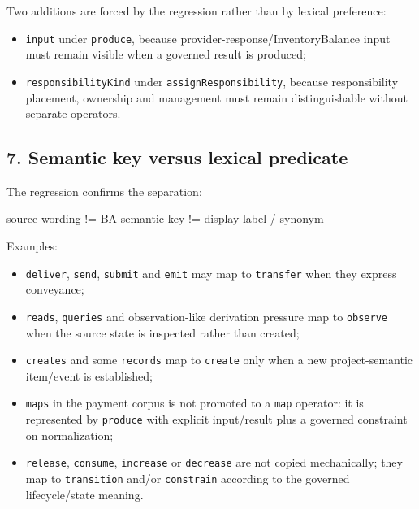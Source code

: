 \documentclass[
  10pt,
  a4paper,
]{article}
\newenvironment{Shaded}{}{}
\newcommand{\NormalTok}[1]{#1}
\providecommand{\tightlist}{%
  \setlength{\itemsep}{0pt}\setlength{\parskip}{0pt}}
\begin{document}
Two additions are forced by the regression rather than by lexical
preference:

\begin{itemize}
\tightlist
\item
  \texttt{input} under \texttt{produce}, because
  provider-response/InventoryBalance input must remain visible when a
  governed result is produced;
\item
  \texttt{responsibilityKind} under \texttt{assignResponsibility},
  because responsibility placement, ownership and management must remain
  distinguishable without separate operators.
\end{itemize}

\subsection{7. Semantic key versus lexical
predicate}\label{7-semantic-key-versus-lexical-predicate}

The regression confirms the separation:

\begin{Shaded}
\begin{Highlighting}[]
\NormalTok{source wording}
\NormalTok{    !=}
\NormalTok{BA semantic key}
\NormalTok{    !=}
\NormalTok{display label / synonym}
\end{Highlighting}
\end{Shaded}

Examples:

\begin{itemize}
\tightlist
\item
  \texttt{deliver}, \texttt{send}, \texttt{submit} and \texttt{emit} may
  map to \texttt{transfer} when they express conveyance;
\item
  \texttt{reads}, \texttt{queries} and observation-like derivation
  pressure map to \texttt{observe} when the source state is inspected
  rather than created;
\item
  \texttt{creates} and some \texttt{records} map to \texttt{create} only
  when a new project-semantic item/event is established;
\item
  \texttt{maps} in the payment corpus is not promoted to a \texttt{map}
  operator: it is represented by \texttt{produce} with explicit
  input/result plus a governed constraint on normalization;
\item
  \texttt{release}, \texttt{consume}, \texttt{increase} or
  \texttt{decrease} are not copied mechanically; they map to
  \texttt{transition} and/or \texttt{constrain} according to the
  governed lifecycle/state meaning.
\end{itemize}
\end{document}
